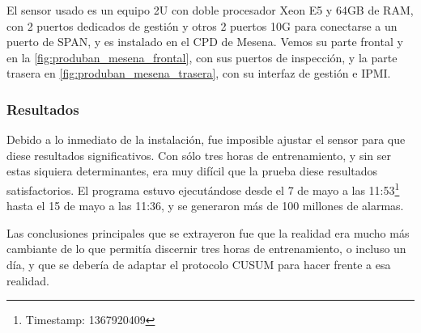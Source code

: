 El sensor usado es un equipo 2U con doble procesador Xeon E5 y 64GB de RAM, con 2 puertos dedicados de gestión y otros 
2 puertos 10G para conectarse a un puerto de SPAN, y es instalado en el CPD de Mesena. Vemos su parte frontal y
en la \autoref{fig:produban_mesena_frontal}, con sus puertos de inspección, y la parte trasera en
\autoref{fig:produban_mesena_trasera}, con su interfaz de gestión e IPMI.


\subsubsection{Resultados}
Debido a lo inmediato de la instalación, fue imposible ajustar el sensor para que diese resultados significativos. Con 
sólo tres horas de entrenamiento, y sin ser estas siquiera determinantes, era muy difícil que la prueba diese 
resultados satisfactorios. El programa estuvo ejecutándose desde el 7 de mayo a las 
11:53\footnote{Timestamp: 1367920409} hasta el 15 de mayo a las 11:36, y se generaron más de 100 millones de alarmas.

Las conclusiones principales que se extrayeron fue que la realidad era mucho más cambiante de lo que permitía discernir 
tres horas de entrenamiento, o incluso un día, y que se debería de adaptar el protocolo CUSUM para hacer frente a esa 
realidad.

\endinput
